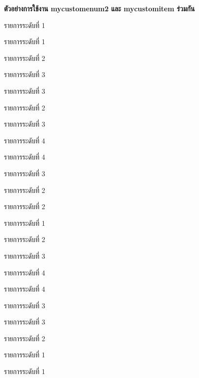 \hspace*{1.5em} %
\textbf{ตัวอย่างการใช้งาน mycustomenum2 และ mycustomitem ร่วมกัน}
\begin{mycustomenum2}
    \item รายการระดับที่ 1
    \item รายการระดับที่ 1
    \begin{mycustomenum2}
        \item รายการระดับที่ 2
        \begin{mycustomitem}[leftmargin=0.7cm,labelwidth=0.7cm]
            \item รายการระดับที่ 3
            \item รายการระดับที่ 3
        \end{mycustomitem}
        \item รายการระดับที่ 2
        \begin{mycustomitem}[leftmargin=0.7cm,labelwidth=0.7cm]
            \item รายการระดับที่ 3
            \begin{mycustomitem}
                \item รายการระดับที่ 4
                \item รายการระดับที่ 4
            \end{mycustomitem}
            \item รายการระดับที่ 3
        \end{mycustomitem}
        \item รายการระดับที่ 2
        \item รายการระดับที่ 2
    \end{mycustomenum2}
    \item รายการระดับที่ 1
    \begin{mycustomenum2}
        \item รายการระดับที่ 2
        \begin{mycustomenum2}
            \item รายการระดับที่ 3
            \begin{mycustomitem}[leftmargin=0.7cm,labelwidth=0.7cm]
                \item รายการระดับที่ 4
                \item รายการระดับที่ 4
            \end{mycustomitem}
            \item รายการระดับที่ 3
            \item รายการระดับที่ 3
        \end{mycustomenum2}
        \item รายการระดับที่ 2
    \end{mycustomenum2}
    \item รายการระดับที่ 1
    \item รายการระดับที่ 1
\end{mycustomenum2}


